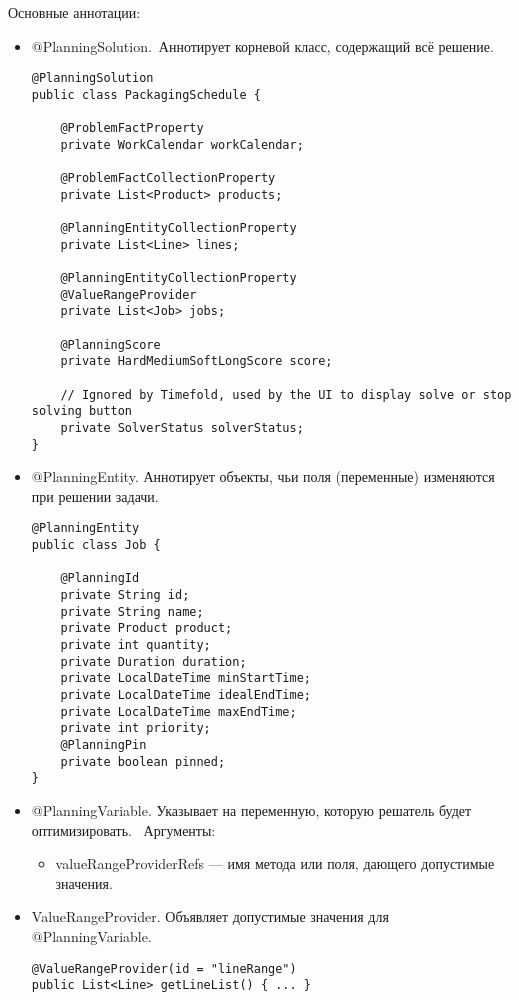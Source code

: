 Основные аннотации:

\begin{itemize}
    \item @PlanningSolution.\
Аннотирует корневой класс, содержащий всё решение.
\begin{lstlisting}[caption={класс PackagingSchedule}, label={lst:plSolution}]
@PlanningSolution
public class PackagingSchedule {

    @ProblemFactProperty
    private WorkCalendar workCalendar;

    @ProblemFactCollectionProperty
    private List<Product> products;

    @PlanningEntityCollectionProperty
    private List<Line> lines;

    @PlanningEntityCollectionProperty
    @ValueRangeProvider
    private List<Job> jobs;

    @PlanningScore
    private HardMediumSoftLongScore score;

    // Ignored by Timefold, used by the UI to display solve or stop solving button
    private SolverStatus solverStatus;
}
\end{lstlisting}

\item @PlanningEntity.
Аннотирует объекты, чьи поля (переменные) изменяются при решении задачи.
\begin{lstlisting}[caption={класс Job}, label={lst:plVariable}]
@PlanningEntity
public class Job {

    @PlanningId
    private String id;
    private String name;
    private Product product;
    private int quantity;
    private Duration duration;
    private LocalDateTime minStartTime;
    private LocalDateTime idealEndTime;
    private LocalDateTime maxEndTime;
    private int priority;
    @PlanningPin
    private boolean pinned;
}
\end{lstlisting}

\item @PlanningVariable. Указывает на переменную, которую решатель будет оптимизировать. \
Аргументы:
\begin{itemize}
    \item valueRangeProviderRefs — имя метода или поля, дающего допустимые значения.
\end{itemize}

\item ValueRangeProvider. Объявляет допустимые значения для @PlanningVariable.
\begin{lstlisting}[caption={класс Job}, label={lst:plValueProvider}]
@ValueRangeProvider(id = "lineRange")
public List<Line> getLineList() { ... }
\end{lstlisting}


\end{itemize}
